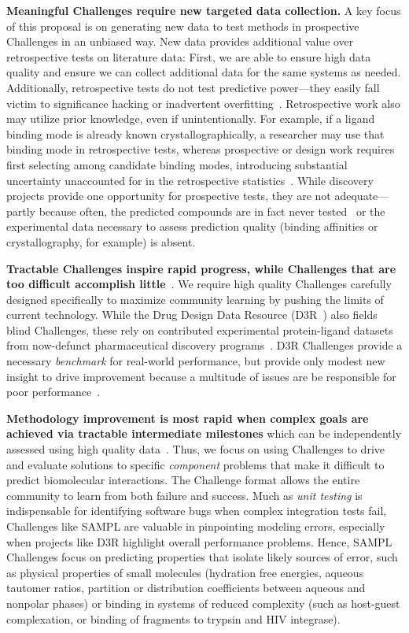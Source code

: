 \documentclass[11pt]{article}
\begin{document}
{\bf Meaningful Challenges require new targeted data collection.}
A key focus of this proposal is on generating new data to test methods in prospective Challenges in an unbiased way. 
New data provides additional value over retrospective tests on literature data:
First, we are able to ensure high data quality and ensure we can collect additional data for the same systems as needed.
Additionally, retrospective tests do not test predictive power---they easily fall victim to significance hacking or inadvertent overfitting~\cite{Nuzzo:2015:Nature}.
Retrospective work also may utilize prior knowledge, even if unintentionally.  
For example, if a ligand binding mode is already known crystallographically, a researcher may use that binding mode in retrospective tests, whereas prospective or design work requires first selecting among candidate binding modes, introducing substantial uncertainty unaccounted for in the retrospective statistics~\cite{mobley_predicting_2007, boyce_predicting_2009, mobley_perspective_2012}.
While discovery projects provide one opportunity for prospective tests, they are not adequate---partly because often, the predicted compounds are in fact never tested~\cite{christ_binding_2016} or the experimental data necessary to assess prediction quality (binding affinities or crystallography, for example) is absent.

{\bf Tractable Challenges inspire rapid progress, while Challenges that are too difficult accomplish little}~\cite{Saez-Rodriguez:2016:NatRevGenet}. 
We require high quality Challenges carefully designed specifically to maximize community learning by pushing the limits of current technology.
While the Drug Design Data Resource (D3R~\cite{Gathiaka:2016:JComputAidedMolDes}) also fields blind Challenges, these rely on contributed experimental protein-ligand datasets from now-defunct pharmaceutical discovery programs~\cite{Gathiaka:2016:JComputAidedMolDes}. 
D3R Challenges provide a necessary \emph{benchmark} for real-world performance, but provide only modest new insight to drive improvement because a multitude of issues are be responsible for poor performance~\cite{D3R_lessons_learned}.

\textbf{Methodology improvement is most rapid when complex goals are achieved via tractable intermediate milestones} which can be independently assessed using high quality data~\cite{Saez-Rodriguez:2016:NatRevGenet}.
Thus, we focus on using Challenges to drive and evaluate solutions to specific \emph{component} problems that make it difficult to predict biomolecular interactions.
The Challenge format allows the entire community to learn from both failure and success.
Much as \emph{unit testing} is indispensable for identifying software bugs when complex integration tests fail, Challenges like SAMPL are valuable in pinpointing modeling errors, especially when projects like D3R highlight overall performance problems.
Hence, SAMPL Challenges focus on predicting properties that isolate likely sources of error, such as physical properties of small molecules (hydration free energies, aqueous tautomer ratios, partition or distribution coefficients between aqueous and nonpolar phases) or binding in systems of reduced complexity (such as host-guest complexation, or binding of fragments to trypsin and HIV integrase).
\end{document}
